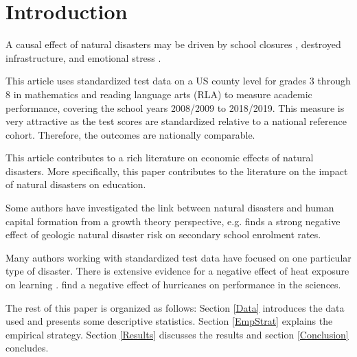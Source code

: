 
\section{Introduction}


A causal effect of natural disasters may be driven by school closures \citep{Grewening_2020}, destroyed infrastructure, and emotional stress \citep{Vogel_2016}. 

This article uses standardized test data on a US county level for grades 3 through 8 in mathematics and reading language arts (RLA) to measure academic performance, covering the school years 2008/2009 to 2018/2019. This measure is very attractive as the test scores are standardized relative to a national reference cohort. Therefore, the outcomes are nationally comparable.

This article contributes to a rich literature on economic effects of natural disasters. More specifically, this paper contributes to the literature on the impact of natural disasters on education.

Some authors have investigated the link between natural disasters and human capital formation from a growth theory perspective, e.g. \cite{Cuaresma_2010} finds a strong negative effect of geologic natural disaster risk on secondary school enrolment rates. 

Many authors working with standardized test data have focused on one particular type of disaster. There is extensive evidence for a negative effect of heat exposure on learning \cite[e.g.][]{Goodman_2020, Park_2020}. \cite{Spencer_2016} find a negative effect of hurricanes on performance in the sciences.

The rest of this paper is organized as follows: Section \ref{Data} introduces the data used and presents some descriptive statistics. Section \ref{EmpStrat} explains the empirical strategy. Section \ref{Results} discusses the results and section \ref{Conclusion} concludes.

